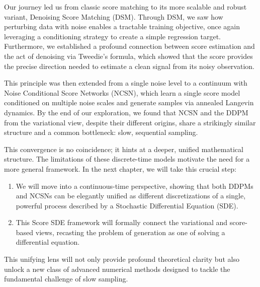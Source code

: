 Our journey led us from classic score matching to its more scalable and robust variant, Denoising Score Matching (DSM). Through DSM, we saw how perturbing data with noise enables a tractable training objective, once again leveraging a conditioning strategy to create a simple regression target. Furthermore, we established a profound connection between score estimation and the act of denoising via Tweedie's formula, which showed that the score provides the precise direction needed to estimate a clean signal from its noisy observation.


This principle was then extended from a single noise level to a continuum with Noise Conditional Score Networks (NCSN), which learn a single score model conditioned on multiple noise scales and generate samples via annealed Langevin dynamics. By the end of our exploration, we found that NCSN and the DDPM from the variational view, despite their different origins, share a strikingly similar structure and a common bottleneck: slow, sequential sampling.



This convergence is no coincidence; it hints at a deeper, unified mathematical structure. The limitations of these discrete-time models motivate the need for a more general framework. In the next chapter, we will take this crucial step:
\begin{enumerate}
    \item We will move into a continuous-time perspective, showing that both DDPMs and NCSNs can be elegantly unified as different discretizations of a single, powerful process described by a Stochastic Differential Equation (SDE).
    \item This Score SDE framework will formally connect the variational and score-based views, recasting the problem of generation as one of solving a differential equation.
\end{enumerate}

This unifying lens will not only provide profound theoretical clarity but also unlock a new class of advanced numerical methods designed to tackle the fundamental challenge of slow sampling. 